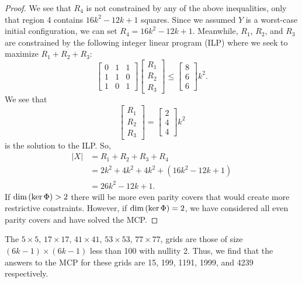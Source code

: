 \documentclass[a4paper]{article}
\newcommand{\abs}[1]{\left| #1 \right|}
\renewcommand{\dim}[1]{\textnormal{dim}\left( #1 \right)}
\begin{document}
\begin{proof}
		We see that $R_4$ is not constrained by any of the above inequalities, only that region 4 contains $16k^2 - 12k + 1$ squares.
		Since we assumed $Y$ is a worst-case initial configuration, we can set $R_4 = 16k^2 - 12k + 1$.
		Meanwhile, $R_1$, $R_2$, and $R_3$ are constrained by the following integer linear program (ILP) where we seek to maximize $R_1 + R_2 + R_3$:
		\begin{equation*}
			\begin{bmatrix}
				0 & 1 & 1 \\
				1 & 1 & 0 \\
				1 & 0 & 1 
			\end{bmatrix}
			\begin{bmatrix}
				R_1 \\
				R_2 \\
				R_3
			\end{bmatrix}
			\leq
			\begin{bmatrix}
				8 \\
				6 \\
				6
			\end{bmatrix}k^2.
		\end{equation*}
		We see that
		\begin{equation*}
			\begin{bmatrix}
				R_1 \\
				R_2 \\
				R_3
			\end{bmatrix}
			=
			\begin{bmatrix}
				2 \\
				4 \\
				4
			\end{bmatrix}k^2
		\end{equation*}
		is the solution to the ILP.
		So,
		\begin{align*}
			\abs{X} &=  R_1 + R_2 + R_3 + R_4 \\
				&= 2k^2 + 4k^2 +  4k^2 + (16k^2 - 12k + 1) \\
				&= 26k^2 - 12k + 1.
		\end{align*}
		If $\dim{\ker{\Phi}} > 2$ there will be more even parity covers that would create more restrictive constraints.
		However, if $\dim{\ker{\Phi}} = 2$, we have considered all even parity covers and have solved the MCP.
	\end{proof}

	The $5 \times 5$, $17 \times 17$, $41 \times 41$, $53 \times 53$, $77 \times 77$, grids are those of size $(6k-1) \times (6k-1)$ less than 100 with nullity 2.
	Thus, we find that the answers to the MCP for these grids are 15, 199, 1191, 1999, and 4239 respectively.
	
\end{document}
